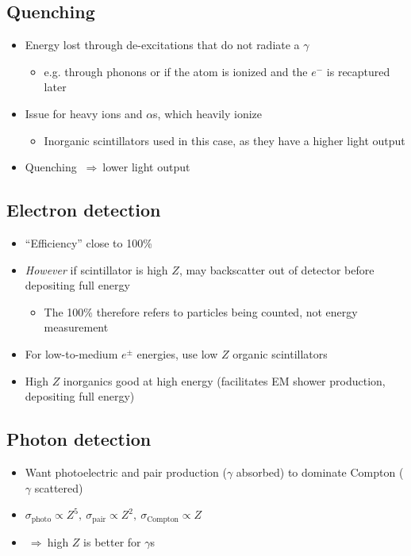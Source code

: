 \documentclass[11pt]{article}
\newcommand{\el}{\ensuremath{e^{-}}\xspace}
\newcommand{\thus}{$~\Rightarrow~$}
\begin{document}
\subsection{Quenching}
\begin{itemize}
  \item Energy lost through de-excitations that do not radiate a $\gamma$ 
  \begin{itemize}
    \item e.g. through phonons or if the atom is ionized and the \el is recaptured later
  \end{itemize}
  \item Issue for heavy ions and $\alpha$s, which heavily ionize
  \begin{itemize}
    \item Inorganic scintillators used in this case, as they have a higher light output
  \end{itemize}
  \item Quenching \thus lower light output
\end{itemize}

\subsection{Electron detection}
\begin{itemize}
  \item ``Efficiency'' close to 100\%
  \item \emph{However} if scintillator is high $Z$, may backscatter out of detector before depositing full energy
  \begin{itemize}
    \item The 100\% therefore refers to particles being counted, not energy measurement
  \end{itemize}
  \item For low-to-medium $e^\pm$ energies, use low $Z$ organic scintillators
  \item High $Z$ inorganics good at high energy (facilitates EM shower production, depositing full energy)
\end{itemize}

\subsection{Photon detection}
\begin{itemize}
  \item Want photoelectric and pair production ($\gamma$ absorbed) to dominate Compton ($\gamma$ scattered)
  \item $\sigma_\text{photo}\propto Z^5,~\sigma_\text{pair}\propto Z^2,~\sigma_\text{Compton}\propto Z$
  \item \thus high $Z$ is better for $\gamma$s
\end{itemize}
\end{document}
